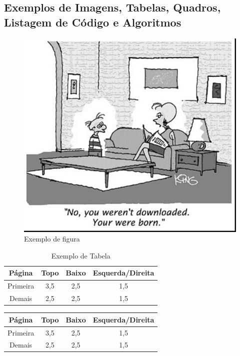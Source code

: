 \subsection{Exemplos de Imagens, Tabelas, Quadros, Listagem de Código e Algoritmos}

\begin{figure}[!h]
    \centering
    \caption{Exemplo de figura}\label{fig:exemplo_figura}
    \includegraphics[width=.4\textwidth]{conteudo/figs/fig1.jpg}
\end{figure}

\begin{table}[!h]
    \centering
    \caption{Exemplo de Tabela}\label{tb:exemplo_tabela}
    \begin{tabular}{cccc}
        \hline Página & Topo & Baixo & Esquerda/Direita \\\hline
        Primeira & 3,5 & 2,5 & 1,5 \\
        Demais & 2,5 & 2,5 & 1,5 \\ \hline
    \end{tabular}
    \vspace{0.1cm}
\end{table}

\newpage

\begin{quadro}[!h]
    \centering
    \caption{Exemplo de Quadro}\label{tb:exemplo_quadro}
    \begin{tabular}{|c|c|c|c|}
        \hline Página & Topo & Baixo & Esquerda/Direita \\\hline
        Primeira & 3,5 & 2,5 & 1,5 \\ \hline
        Demais & 2,5 & 2,5 & 1,5 \\ \hline
    \end{tabular}
    \vspace{0.1cm}
    \vspace{0.1cm}
\end{quadro}

